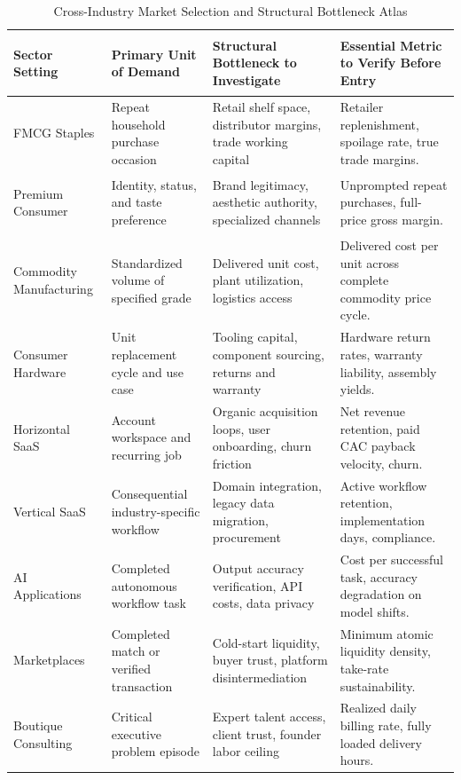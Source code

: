 \begin{table}[t!]
\centering
\scriptsize
\caption{Cross-Industry Market Selection and Structural Bottleneck Atlas}
\label{tab:industry_atlas}
\begin{tabularx}{\textwidth}{>{\bfseries\raggedright\arraybackslash}p{2.3cm} >{\raggedright\arraybackslash}p{3.2cm} >{\raggedright\arraybackslash}p{4.2cm} X}
\toprule
\textbf{Sector Setting} & \textbf{Primary Unit of Demand} & \textbf{Structural Bottleneck to Investigate} & \textbf{Essential Metric to Verify Before Entry} \\
\midrule
FMCG Staples & Repeat household purchase occasion & Retail shelf space, distributor margins, trade working capital & Retailer replenishment, spoilage rate, true trade margins. \\
\addlinespace[1.5pt]
Premium Consumer & Identity, status, and taste preference & Brand legitimacy, aesthetic authority, specialized channels & Unprompted repeat purchases, full-price gross margin. \\
\addlinespace[1.5pt]
Commodity Manufacturing & Standardized volume of specified grade & Delivered unit cost, plant utilization, logistics access & Delivered cost per unit across complete commodity price cycle. \\
\addlinespace[1.5pt]
Consumer Hardware & Unit replacement cycle and use case & Tooling capital, component sourcing, returns and warranty & Hardware return rates, warranty liability, assembly yields. \\
\addlinespace[1.5pt]
Horizontal SaaS & Account workspace and recurring job & Organic acquisition loops, user onboarding, churn friction & Net revenue retention, paid CAC payback velocity, churn. \\
\addlinespace[1.5pt]
Vertical SaaS & Consequential industry-specific workflow & Domain integration, legacy data migration, procurement & Active workflow retention, implementation days, compliance. \\
\addlinespace[1.5pt]
AI Applications & Completed autonomous workflow task & Output accuracy verification, API costs, data privacy & Cost per successful task, accuracy degradation on model shifts. \\
\addlinespace[1.5pt]
Marketplaces & Completed match or verified transaction & Cold-start liquidity, buyer trust, platform disintermediation & Minimum atomic liquidity density, take-rate sustainability. \\
\addlinespace[1.5pt]
Boutique Consulting & Critical executive problem episode & Expert talent access, client trust, founder labor ceiling & Realized daily billing rate, fully loaded delivery hours. \\

\end{tabularx}
\end{table}
